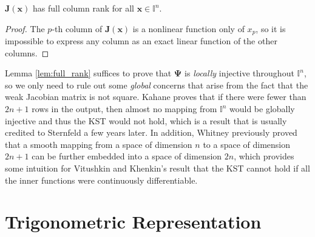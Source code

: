 \begin{lemma}
  \label{lem:full_rank}
  $\mathbf{J}\left(\mathbf{x}\right)$ has full column rank for all $\mathbf{x} \in \mathbb{I}^n$.
\end{lemma}
\begin{proof}
  The $p$-th column of $\mathbf{J}\left(\mathbf{x}\right)$ is a nonlinear function only of $x_p$, so it is impossible to express any column as an exact linear function of the other columns.
\end{proof}

\begin{remark*}
  Lemma \ref{lem:full_rank} suffices to prove that $\boldsymbol{\Psi}$ is \emph{locally} injective throughout $\mathbb{I}^n$, so we only need to rule out some \emph{global} concerns that arise from the fact that the weak Jacobian matrix is not square. Kahane proves that if there were fewer than $2n + 1$ rows in the output, then almost no mapping from $\mathbb{I}^n$ would be globally injective and thus the KST would not hold, which is a result that is usually credited to Sternfeld a few years later. In addition, Whitney previously proved that a smooth mapping from a space of dimension $n$ to a space of dimension $2n + 1$ can be further embedded into a space of dimension $2n$, which provides some intuition for Vitushkin and Khenkin's result that the KST cannot hold if all the inner functions were continuously differentiable.
\end{remark*}




\section{Trigonometric Representation}\label{sec:TrigonometricRepresentation}

